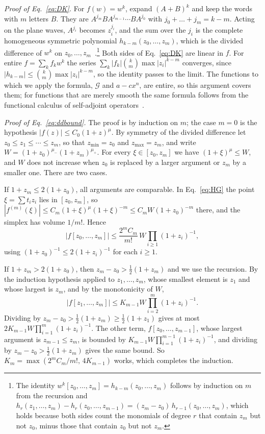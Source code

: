 \documentclass[a4paper,11pt]{article}
\begin{document}
\textit{Proof of Eq.~\eqref{eq:DK}.} For $f(w)=w^k$, expand $(A+B)^k$ and keep the words with $m$ letters $B$. They are $A^{j_m}BA^{j_{m-1}}\cdots BA^{j_0}$ with $j_0+\dots+j_m=k-m$. Acting on the plane waves, $A^{j_i}$ becomes $z_i^{j_i}$, and the sum over the $j_i$ is the complete homogeneous symmetric polynomial $h_{k-m}(z_0,\dots,z_m)$, which is the divided difference of $w^k$ on $z_0,\dots,z_m$~\cite{deBoor2005}.\footnote{The identity $w^k[z_0,\dots,z_m]=h_{k-m}(z_0,\dots,z_m)$ follows by induction on $m$ from the recursion and $h_r(z_1,\dots,z_m)-h_r(z_0,\dots,z_{m-1})=(z_m-z_0)\,h_{r-1}(z_0,\dots,z_m)$, which holds because both sides count the monomials of degree $r$ that contain $z_m$ but not $z_0$, minus those that contain $z_0$ but not $z_m$.} Both sides of Eq.~\eqref{eq:DK} are linear in $f$. For entire $f=\sum_kf_kw^k$ the series $\sum_k|f_k|\binom km\max|z_i|^{k-m}$ converges, since $|h_{k-m}|\le\binom km\max|z_i|^{k-m}$, so the identity passes to the limit. The functions to which we apply the formula, $\mathcal G$ and $a-cx^n$, are entire, so this argument covers them; for functions that are merely smooth the same formula follows from the functional calculus of self-adjoint operators~\cite{DaletskiiKrein1965}.

\textit{Proof of Eq.~\eqref{eq:ddbound}.} The proof is by induction on $m$; the case $m=0$ is the hypothesis $|f(z)|\le C_0(1+z)^\mu$. By symmetry of the divided difference let $z_0\le z_1\le\cdots\le z_m$, so that $z_{\min}=z_0$ and $z_{\max}=z_m$, and write $W=(1+z_0)^{\mu_-}(1+z_m)^{\mu_+}$. For every $\xi\in[z_0,z_m]$ we have $(1+\xi)^{\mu}\le W$, and $W$ does not increase when $z_0$ is replaced by a larger argument or $z_m$ by a smaller one. There are two cases.

If $1+z_m\le2(1+z_0)$, all arguments are comparable. In Eq.~\eqref{eq:HG} the point $\xi=\sum t_iz_i$ lies in $[z_0,z_m]$, so $|f^{(m)}(\xi)|\le C_m(1+\xi)^{\mu}(1+\xi)^{-m}\le C_mW(1+z_0)^{-m}$ there, and the simplex has volume $1/m!$. Hence
\[
|f[z_0,\dots,z_m]|\le\frac{2^mC_m}{m!}\,W\prod_{i\ge1}(1+z_i)^{-1},
\]
using $(1+z_0)^{-1}\le2(1+z_i)^{-1}$ for each $i\ge1$.

If $1+z_m>2(1+z_0)$, then $z_m-z_0>\frac12(1+z_m)$ and we use the recursion. By the induction hypothesis applied to $z_1,\dots,z_m$, whose smallest element is $z_1$ and whose largest is $z_m$, and by the monotonicity of $W$,
\[
|f[z_1,\dots,z_m]|\le K_{m-1}W\prod_{i=2}^m(1+z_i)^{-1}.
\]
Dividing by $z_m-z_0>\frac12(1+z_m)\ge\frac12(1+z_1)$ gives at most $2K_{m-1}W\prod_{i=1}^m(1+z_i)^{-1}$. The other term, $f[z_0,\dots,z_{m-1}]$, whose largest argument is $z_{m-1}\le z_m$, is bounded by $K_{m-1}W\prod_{i=1}^{m-1}(1+z_i)^{-1}$, and dividing by $z_m-z_0>\frac12(1+z_m)$ gives the same bound. So $K_m=\max(2^mC_m/m!,\,4K_{m-1})$ works, which completes the induction.
\end{document}
